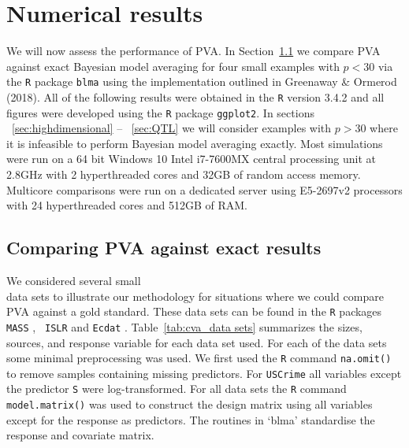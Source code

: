 \section{Numerical results}
\label{sec:numerical}

We will now assess the performance of PVA\@. In Section~\ref{sec:exact} we
compare PVA against exact Bayesian model averaging for four small examples with
$p<30$ via the {\tt R} package {\tt blma} using the implementation outlined in
Greenaway \& Ormerod (2018). All of the following results were obtained in the
{\tt R} version 3.4.2 \citep{CiteR} and all figures were developed using the
{\tt R} package {\tt ggplot2}. In sections
~\ref{sec:highdimensional} -- ~\ref{sec:QTL} we will consider examples with $p>30$
where it is infeasible to perform Bayesian model averaging exactly. Most
simulations were run on a 64 bit Windows 10 Intel i7-7600MX central processing
unit at 2.8GHz with 2 hyperthreaded cores and 32GB of random access memory.
Multicore comparisons were run on a dedicated server using E5-2697v2 processors
with 24 hyperthreaded cores and 512GB of RAM.

\subsection{Comparing PVA against exact results} 
\label{sec:exact}

We considered several small \\ data sets to illustrate our methodology for
situations where we could compare PVA against a gold standard. These data sets
can be found in the {\tt R} packages {\tt MASS} \citep{Venables2002},  {\tt
ISLR} \cite{James:2014:ISL:2517747} and {\tt Ecdat} \citep{Croissant2016}.
Table~\ref{tab:cva_data sets} summarizes the sizes,  sources, and response
variable for each data set used.   For each of the data sets some minimal
preprocessing was used.  We first used the {\tt R} command {\tt na.omit()} to
remove samples containing missing predictors.  For {\tt USCrime} all variables
except the predictor {\tt S} were log-transformed. For all data sets the {\tt R}
command {\tt model.matrix()} was used to construct the design matrix using all
variables except for the response as predictors. The routines in `blma'
standardise the response and covariate matrix.

